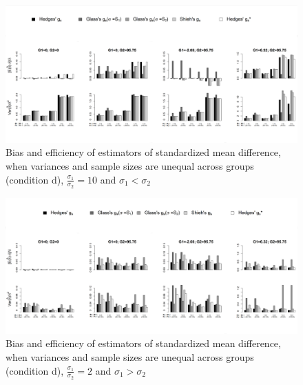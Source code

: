 \documentclass[
  english,
  man,floatsintext]{apa6}
\begin{document}
\begin{figure}

{\centering \includegraphics[width=6.31in]{Scripts outputs/Quality of ES measures/Graphs/Unbiased estimators/Combined Figures_relative quality/Het_firstsmaller_SDR10} 

}

\caption{Bias and efficiency of estimators of standardized mean difference, when variances and sample sizes are unequal across groups (condition d), $\frac{\sigma_1}{\sigma_2}=10$ and $\sigma_1<\sigma_2$}\label{fig:idHetunbal2}
\end{figure}

\begin{figure}

{\centering \includegraphics[width=6.31in]{Scripts outputs/Quality of ES measures/Graphs/Unbiased estimators/Combined Figures_relative quality/Het_firstlarger_SDR2} 

}

\caption{Bias and efficiency of estimators of standardized mean difference, when variances and sample sizes are unequal across groups (condition d), $\frac{\sigma_1}{\sigma_2}=2$ and $\sigma_1>\sigma_2$}\label{fig:idHetunbal3}
\end{figure}
\end{document}
